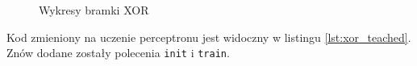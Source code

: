\documentclass[pointlessnumbers, abstracton, headsepline, a4paper]{scrartcl}
\begin{document}
\begin{figure}[!h]
\caption{\label{fig:xor}Wykresy bramki XOR}
\end{figure}

Kod zmieniony na uczenie perceptronu jest widoczny w listingu \ref{lst:xor_teached}. Znów dodane zostały polecenia \texttt{init} i \texttt{train}.

\begin{center}
\begin{minipage}{0.5\textwidth}
\lstset{captionpos=b,caption=Kod uczonej bramki XOR,label=lst:xor_teached}

\end{minipage}
\end{center}
\end{document}
